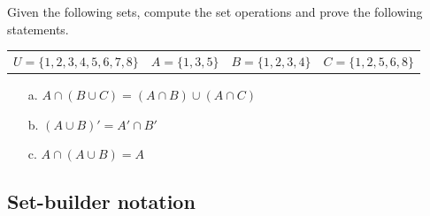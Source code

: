 \documentclass[a4paper,12pt]{book}
\newcounter{question}
\begin{document}
        \begin{questionNOGRADE}{\thequestion}

            Given the following sets, compute the set operations and prove
            the following statements.

            \begin{tabular}{l l l l}
                $U = \{1, 2, 3, 4, 5, 6, 7, 8 \} $ &
                $A = \{1, 3, 5\}$ &
                $B = \{1, 2, 3, 4\}$ &
                $C = \{1, 2, 5, 6, 8\}$
            \end{tabular}

            \begin{enumerate}
                \item[a.]   $A \cap (B \cup C) = (A \cap B) \cup (A \cap C)$
                    \solution{}{ ~\\ \raisebox{0pt}[4cm][0pt]{  } }

                \item[b.]   $(A \cup B)' = A' \cap B'$
                    \solution{}{ ~\\ \raisebox{0pt}[4cm][0pt]{  } }

                \item[c.]   $A \cap (A \cup B) = A$
                    \solution{}{ ~\\ \raisebox{0pt}[4cm][0pt]{  } }
            \end{enumerate}

        \end{questionNOGRADE}

        \newpage

        \subsection{Set-builder notation}
\end{document}
